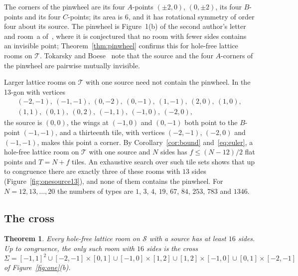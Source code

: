 \documentclass[11pt,a4paper]{article}
\theoremstyle{plain}
\newtheorem{theorem}{Theorem}[section]
\theoremstyle{definition}
\theoremstyle{remark}
\newcommand{\T}{\mathcal{T}}
\newcommand{\Sq}{\mathcal{S}}
\numberwithin{equation}{section}
\begin{document}
The corners of the pinwheel are its four $A$-points $(\pm2,0)$, $(0,\pm2)$, its four $B$-points and its four $C$-points; its area is $6$, and it has rotational symmetry of order four about its source. The pinwheel is Figure~1(b) of the second author's letter~\cite{Tok96} and room~a of~\cite{Stewart97}, where it is conjectured that no room with fewer sides contains an invisible point; Theorem~\ref{thm:pinwheel} confirms this for hole-free lattice rooms on $\T$. Tokarsky and Boese~\cite[Figure~6]{TB} note that the source and the four $A$-corners of the pinwheel are pairwise mutually invisible.

Larger lattice rooms on $\T$ with one source need not contain the pinwheel. In the 13-gon with vertices
\[
\begin{gathered}(-2,-1),\ (-1,-1),\ (0,-2),\ (0,-1),\ (1,-1),\ (2,0),\ (1,0),\\ (1,1),\ (0,1),\ (0,2),\ (-1,1),\ (-1,0),\ (-2,0),\end{gathered}
\]
the source is $(0,0)$, the wings at $(-1,0)$ and $(0,-1)$ both point to the $B$-point $(-1,-1)$, and a thirteenth tile, with vertices $(-2,-1)$, $(-2,0)$ and $(-1,-1)$, makes this point a corner. By Corollary~\ref{cor:bound} and~\eqref{eq:euler}, a hole-free lattice room on $\T$ with one source and $N$ sides has $f\le(N-12)/2$ flat points and $T=N+f$ tiles. An exhaustive search over such tile sets shows that up to congruence there are exactly three of these rooms with $13$ sides (Figure~\ref{fig:onesource13}), and none of them contains the pinwheel. For $N=12,13,\dots,20$ the numbers of types are $1$, $3$, $4$, $19$, $67$, $84$, $253$, $783$ and $1346$.

\subsection{The cross}
\begin{theorem}\label{thm:square}
Every hole-free lattice room on $\Sq$ with a source has at least $16$ sides. Up to congruence, the only such room with $16$ sides is the \emph{cross}
\[
\Sigma=[-1,1]^2\cup[-2,-1]\times[0,1]\cup[-1,0]\times[1,2]\cup[1,2]\times[-1,0]\cup[0,1]\times[-2,-1]
\]
of Figure~\textup{\ref{fig:one}(b)}.
\end{theorem}
\end{document}
